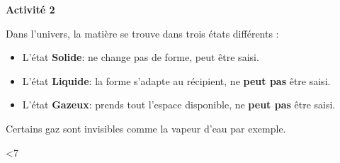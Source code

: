 \documentclass[10pt]{article}
\newcommand{\titre}{Activité 2} %
\newcommand{\sep}{-4pt} %
\newcommand{\DoItNTimes}{7} %
\begin{document}
\thispagestyle{fancy}
\cfoot{}


\setcounter{int}{1}
\loop

\begin{mybox}{\textbf{\titre}}    
    \setlength\parindent{4pt} %
    \setlength\parskip{5pt} 

    Dans l'univers, la matière se trouve dans trois états différents :
    \begin{itemize}
        \item L'état \textbf{\color{DarkRed} {Solide}}: ne change pas de forme, peut être saisi.
        \item L'état \textbf{\color{DarkRed} {Liquide}}: la forme s'adapte au récipient, ne \textbf{peut pas} être saisi.
        \item L'état \textbf{\color{DarkRed} {Gazeux}}: prends tout l'espace disponible, ne \textbf{peut pas} être saisi.
    \end{itemize}
    
    Certains gaz sont invisibles comme la vapeur d'eau par exemple.

\end{mybox}

\vspace{\sep}

\addtocounter{int}{1}
\ifnum\value{int}<\DoItNTimes\repeat
\end{document}
